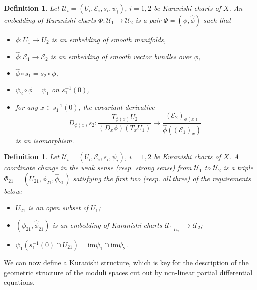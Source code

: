 \documentclass[a4paper]{article}
\newtheorem{definition}[theorem]{Definition}
\numberwithin{equation}{section}
\begin{document}
\begin{definition}
	Let $\mathcal{U}_i=(U_i,\mathcal{E}_i,s_i,\psi_i)$, $i=1,2$ be Kuranishi charts of $X$. An embedding of Kuranishi charts $\Phi:\mathcal{U}_1\rightarrow\mathcal{U}_2$ is a pair $\Phi=(\phi,\hat{\phi})$ such that
	\begin{itemize}
		\item[(i)] $\phi:U_1\rightarrow U_2$ is an embedding of smooth manifolds,
		\item[(ii)] $\hat{\phi}:\mathcal{E}_1\rightarrow\mathcal{E}_2$ is an embedding of smooth vector bundles over $\phi$,
		\item[(iii)] $\hat{\phi}\circ s_1=s_2\circ\phi$,
		\item[(iv)] $\psi_2\circ\phi=\psi_1$ on $s_1^{-1}(0)$,
		\item[(v)] for any $x\in s_1^{-1}(0)$, the covariant derivative
		\begin{equation}\label{eq:co-der}
			D_{\phi(x)}s_2:\frac{T_{\phi(x)}U_2}{(D_x\phi)(T_xU_1)}\rightarrow\frac{(\mathcal{E}_2)_{\phi(x)}}{\hat{\phi}((\mathcal{E}_1)_x)}
		\end{equation}
		is an isomorphism.
	\end{itemize}
\end{definition}

\begin{definition}
Let $\mathcal{U}_i=(U_i,\mathcal{E}_i,s_i,\psi_i)$, $i=1,2$ be Kuranishi charts of $X$. A coordinate change in the weak sense (resp. strong sense) from $\mathcal{U}_1$ to $\mathcal{U}_2$ is a triple $\Phi_{21}=(U_{21},\phi_{21},\hat{\phi}_{21})$ satisfying the first two (resp. all three) of the requirements below:
	\begin{itemize}
		\item[(i)] $U_{21}$ is an open subset of $U_1$;
		\item[(ii)] $(\phi_{21},\hat{\phi}_{21})$ is an embedding of Kuranishi charts $\mathcal{U}_1|_{U_{21}}\rightarrow\mathcal{U}_2$;
		\item[(iii)] $\psi_1\left(s_1^{-1}(0)\cap U_{21}\right)=\mathrm{im}\psi_1\cap\mathrm{im}\psi_2$.
	\end{itemize}
\end{definition}

We can now define a Kuranishi structure, which is key for the description of the geometric structure of the moduli spaces cut out by non-linear partial differential equations.
\end{document}
